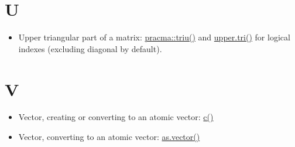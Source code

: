 \documentclass[
]{book}
\providecommand{\tightlist}{%
  \setlength{\itemsep}{0pt}\setlength{\parskip}{0pt}}
\begin{document}
\hypertarget{u}{%
\section*{U}\label{u}}

\begin{itemize}
\tightlist
\item
  Upper triangular part of a matrix: \href{https://rdrr.io/rforge/pracma/man/tri.html}{pracma::triu()} and \href{https://stat.ethz.ch/R-manual/R-patched/library/base/html/lower.tri.html}{upper.tri()} for logical indexes (excluding diagonal by default).
\end{itemize}

\hypertarget{v}{%
\section*{V}\label{v}}

\begin{itemize}
\tightlist
\item
  Vector, creating or converting to an atomic vector: \href{https://stat.ethz.ch/R-manual/R-patched/library/base/html/c.html}{c()}
\item
  Vector, converting to an atomic vector: \href{https://stat.ethz.ch/R-manual/R-patched/library/base/html/vector.html}{as.vector()}
\end{itemize}

  
\end{document}
